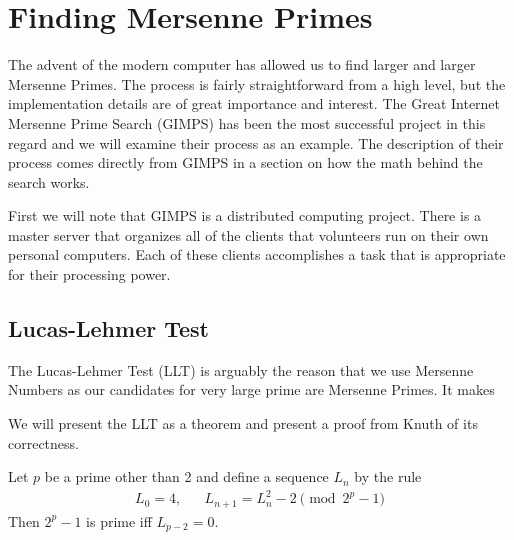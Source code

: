 \section{Finding Mersenne Primes}


The advent of the modern computer has allowed us to find larger and larger Mersenne Primes.  The process is fairly straightforward from a high level, but the implementation details are of great importance and interest. The Great Internet Mersenne Prime Search (GIMPS) has been the most successful project in this regard and we will examine their process as an example.  The description of their process comes directly from GIMPS \cite{gimps} in a section on how the math behind the search works. 

First we will note that GIMPS is a distributed computing project.  There is a master server that organizes all of the clients that volunteers run on their own personal computers.  Each of these clients accomplishes a task that is appropriate for their processing power.  %

\subsection{Lucas-Lehmer Test}

The Lucas-Lehmer Test (LLT) is arguably the reason that we use Mersenne Numbers as our candidates for very large prime are Mersenne Primes.  It makes %


We will present the LLT as a theorem and present a proof from Knuth \cite{taocp} of its correctness.

\begin{thm} 
Let $p$ be a prime other than 2 and define a sequence $L_n$ by the rule
\begin{align}
L_0 = 4,&&L_{n+1} = L_n^2 - 2 \pmod{2^p - 1}
\end{align}
Then $2^p - 1$ is prime iff $L_{p-2} = 0$.
\end{thm}

